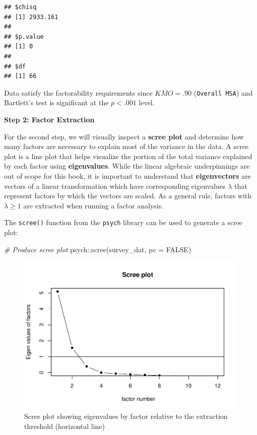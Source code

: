 \documentclass[
]{book}
\newenvironment{Shaded}{\begin{snugshade}}{\end{snugshade}}
\newcommand{\AttributeTok}[1]{\textcolor[rgb]{0.77,0.63,0.00}{#1}}
\newcommand{\CommentTok}[1]{\textcolor[rgb]{0.56,0.35,0.01}{\textit{#1}}}
\newcommand{\ConstantTok}[1]{\textcolor[rgb]{0.00,0.00,0.00}{#1}}
\newcommand{\FunctionTok}[1]{\textcolor[rgb]{0.00,0.00,0.00}{#1}}
\newcommand{\NormalTok}[1]{#1}
\newcommand{\SpecialCharTok}[1]{\textcolor[rgb]{0.00,0.00,0.00}{#1}}
\begin{document}
\begin{verbatim}
## $chisq
## [1] 2933.161
## 
## $p.value
## [1] 0
## 
## $df
## [1] 66
\end{verbatim}

Data satisfy the factorability requirements since \(KMO = .90\) (\texttt{Overall\ MSA}) and Bartlett's test is significant at the \(p < .001\) level.

\textbf{Step 2: Factor Extraction}

For the second step, we will visually inspect a \textbf{scree plot} and determine how many factors are necessary to explain most of the variance in the data. A scree plot is a line plot that helps visualize the portion of the total variance explained by each factor using \textbf{eigenvalues}. While the linear algebraic underpinnings are out of scope for this book, it is important to understand that \textbf{eigenvectors} are vectors of a linear transformation which have corresponding eigenvalues \(\lambda\) that represent factors by which the vectors are scaled. As a general rule, factors with \(\lambda \ge 1\) are extracted when running a factor analysis.

The \texttt{scree()} function from the \texttt{psych} library can be used to generate a scree plot:

\begin{Shaded}
\begin{Highlighting}[]
\CommentTok{\# Produce scree plot}
\NormalTok{psych}\SpecialCharTok{::}\FunctionTok{scree}\NormalTok{(survey\_dat, }\AttributeTok{pc =} \ConstantTok{FALSE}\NormalTok{)}
\end{Highlighting}
\end{Shaded}

\begin{figure}

{\centering \includegraphics[width=1\linewidth]{The_Fundamentals_of_People_Analytics_files/figure-latex/scree-plot-1} 

}

\caption{Scree plot showing eigenvalues by factor relative to the extraction threshold (horizontal line)}\label{fig:scree-plot}
\end{figure}
\end{document}
